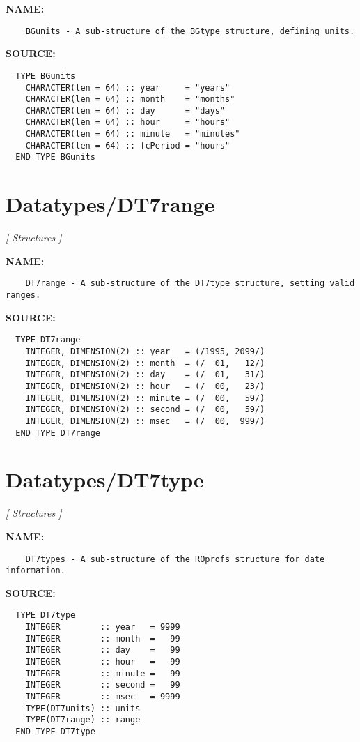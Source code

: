 \label{ch:robo21}
\label{ch:Datatypes_BGunits}
\textbf{NAME:}\hspace{0.08in}\begin{Verbatim}
    BGunits - A sub-structure of the BGtype structure, defining units.
\end{Verbatim}
\textbf{SOURCE:}\hspace{0.08in}\begin{Verbatim}
  TYPE BGunits
    CHARACTER(len = 64) :: year     = "years"
    CHARACTER(len = 64) :: month    = "months"
    CHARACTER(len = 64) :: day      = "days"
    CHARACTER(len = 64) :: hour     = "hours"
    CHARACTER(len = 64) :: minute   = "minutes"
    CHARACTER(len = 64) :: fcPeriod = "hours"
  END TYPE BGunits
\end{Verbatim}
\section{Datatypes/DT7range}
\textsl{[ Structures ]}

\label{ch:robo22}
\label{ch:Datatypes_DT7range}
\textbf{NAME:}\hspace{0.08in}\begin{Verbatim}
    DT7range - A sub-structure of the DT7type structure, setting valid ranges.
\end{Verbatim}
\textbf{SOURCE:}\hspace{0.08in}\begin{Verbatim}
  TYPE DT7range
    INTEGER, DIMENSION(2) :: year   = (/1995, 2099/)
    INTEGER, DIMENSION(2) :: month  = (/  01,   12/)
    INTEGER, DIMENSION(2) :: day    = (/  01,   31/)
    INTEGER, DIMENSION(2) :: hour   = (/  00,   23/)
    INTEGER, DIMENSION(2) :: minute = (/  00,   59/)
    INTEGER, DIMENSION(2) :: second = (/  00,   59/)
    INTEGER, DIMENSION(2) :: msec   = (/  00,  999/)
  END TYPE DT7range
\end{Verbatim}
\section{Datatypes/DT7type}
\textsl{[ Structures ]}

\label{ch:robo23}
\label{ch:Datatypes_DT7type}
\textbf{NAME:}\hspace{0.08in}\begin{Verbatim}
    DT7types - A sub-structure of the ROprofs structure for date information.
\end{Verbatim}
\textbf{SOURCE:}\hspace{0.08in}\begin{Verbatim}
  TYPE DT7type
    INTEGER        :: year   = 9999
    INTEGER        :: month  =   99
    INTEGER        :: day    =   99
    INTEGER        :: hour   =   99
    INTEGER        :: minute =   99
    INTEGER        :: second =   99
    INTEGER        :: msec   = 9999
    TYPE(DT7units) :: units
    TYPE(DT7range) :: range
  END TYPE DT7type
\end{Verbatim}
